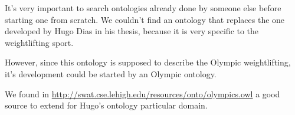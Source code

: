 \par It's very important to search ontologies already done by someone else before starting one from scratch. We couldn't find an ontology that replaces the one developed by Hugo Dias in his thesis, because it is very specific to the weightlifting sport.
\par However, since this ontology is supposed to describe the Olympic weightlifting, it's development could be started by an Olympic ontology. 
\par We found in \url{http://swat.cse.lehigh.edu/resources/onto/olympics.owl}  a good source to extend for Hugo's ontology particular domain. 